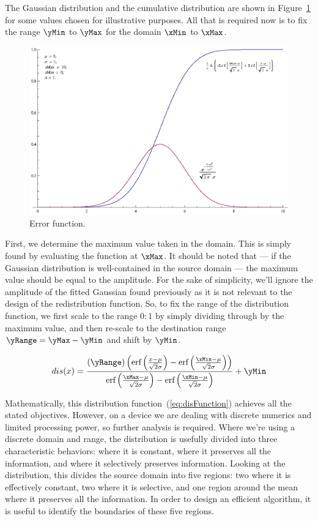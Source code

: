 The Gaussian distribution and the cumulative distribution are shown in Figure~\ref{fig:ErrorFunctionGraph} for some values chosen for illustrative purposes. All that is required now is to fix the range $\yMin$ to $\yMax$ for the domain $\xMin$ to $\xMax$.

\begin{figure}[h!]
  \caption{Error function.}  \label{fig:ErrorFunctionGraph}
  \centering
    \includegraphics[width=\textwidth]{Chapter2/Figs/errorFunction.eps}
\end{figure}

First, we determine the maximum value taken in the domain. This is simply found by evaluating the function at $\xMax$. It should be noted that --- if the Gaussian distribution is well-contained in the source domain --- the maximum value should be equal to the amplitude. For the sake of simplicity, we'll ignore the amplitude of the fitted Gaussian found previously as it is not relevant to the design of the redistribution function. So, to fix the range of the distribution function, we first scale to the range $0:1$ by simply dividing through by the maximum value, and then re-scale to the destination range $\yRange = \yMax - \yMin$ and shift by $\yMin$.

\begin{equation}\label{eq:disFunction}
  dis(x) = \frac{(\yRange) \left(\text{erf}\left(\frac{x-\mu }{\sqrt{2} \sigma }\right)-\text{erf}\left(\frac{\xMin-\mu }{\sqrt{2} \sigma }\right)\right)}{\text{erf}\left(\frac{\xMax-\mu }{\sqrt{2} \sigma }\right)-\text{erf}\left(\frac{\xMin-\mu }{\sqrt{2} \sigma }\right)}+\yMin
\end{equation}

Mathematically, this distribution function~(\ref{eq:disFunction}) achieves all the stated objectives. However, on a device we are dealing with discrete numerics and limited processing power, so further analysis is required. Where we're using a discrete domain and range, the distribution is usefully divided into three characteristic behaviors:  where it is constant, where it preserves all the information, and where it selectively preserves information. Looking at the distribution, this divides the source domain into five regions: two where it is effectively constant, two where it is selective, and one region around the mean where it preserves all the information. In order to design an efficient algorithm, it is useful to identify the boundaries of these five regions.

